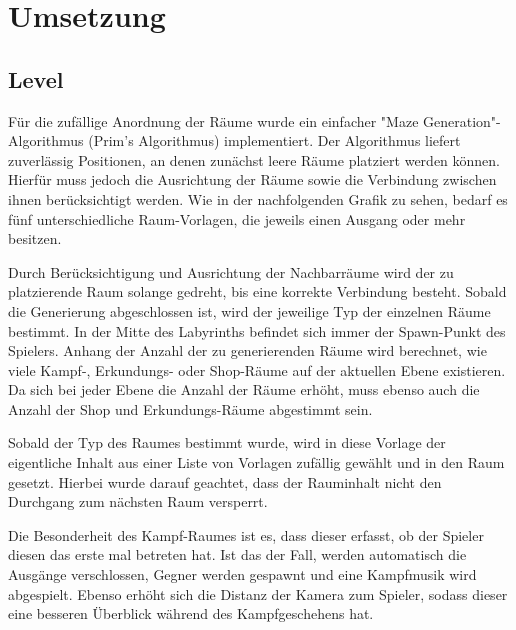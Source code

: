 \section{Umsetzung}

\subsection{Level}

Für die zufällige Anordnung der Räume wurde ein einfacher "Maze Generation"-Algorithmus (Prim's Algorithmus) implementiert. Der Algorithmus liefert zuverlässig Positionen, an denen zunächst leere Räume platziert werden können. Hierfür muss jedoch die Ausrichtung der Räume sowie die Verbindung zwischen ihnen berücksichtigt werden.  Wie in der nachfolgenden Grafik zu sehen, bedarf es fünf unterschiedliche Raum-Vorlagen, die jeweils einen Ausgang oder mehr besitzen.


Durch Berücksichtigung und Ausrichtung der Nachbarräume wird der zu platzierende Raum solange gedreht, bis eine korrekte Verbindung besteht. Sobald die Generierung abgeschlossen ist, wird der jeweilige Typ der einzelnen Räume bestimmt. In der Mitte des Labyrinths befindet sich immer der Spawn-Punkt des Spielers. Anhang der Anzahl der zu generierenden Räume wird berechnet, wie viele Kampf-, Erkundungs- oder Shop-Räume auf der aktuellen Ebene existieren. Da sich bei jeder Ebene die Anzahl der Räume erhöht, muss ebenso auch die Anzahl der Shop und Erkundungs-Räume abgestimmt sein. 


Sobald der Typ des Raumes bestimmt wurde, wird in diese Vorlage der eigentliche Inhalt aus einer Liste von Vorlagen zufällig gewählt und in den Raum gesetzt. Hierbei wurde darauf geachtet, dass der Rauminhalt nicht den Durchgang zum nächsten Raum versperrt.


Die Besonderheit des Kampf-Raumes ist es, dass dieser erfasst, ob der Spieler diesen das erste mal betreten hat. Ist das der Fall, werden automatisch die Ausgänge verschlossen, Gegner werden gespawnt und eine Kampfmusik wird abgespielt. Ebenso erhöht sich die Distanz der Kamera zum Spieler, sodass dieser eine besseren Überblick während des Kampfgeschehens hat. \\

